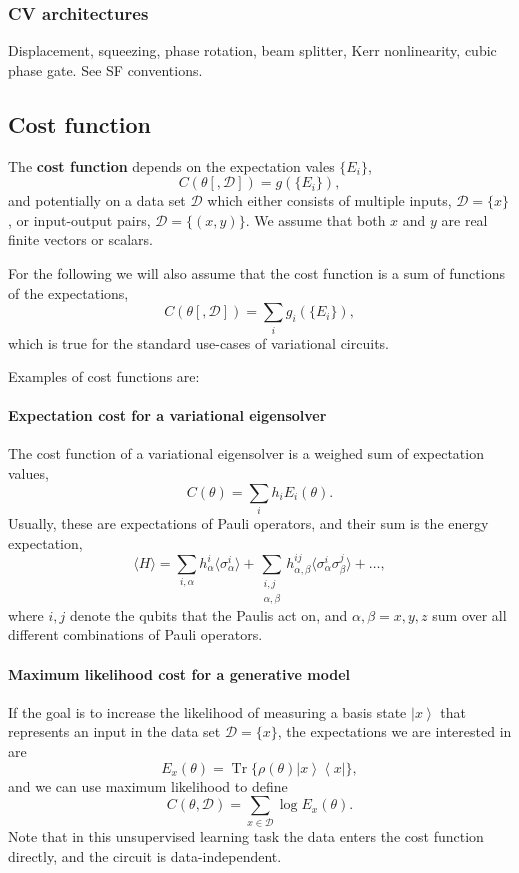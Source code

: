 \documentclass[amsmath,amssymb,aps,pra,10pt,twocolumn,groupedaddress,nofootinbib]{revtex4-1}
\DeclareMathOperator{\tr}{Tr}
\newcommand{\be}{\begin{equation}}
\newcommand{\ee}{\end{equation}}
\newcommand{\ket}[1]{\ensuremath{\left| #1 \right \rangle}}
\newcommand{\bra}[1]{\ensuremath{\left \langle #1 \right |}}
\newcommand{\ketbra}[2]{\ket{#1}\bra{#2}}
\begin{document}
\subsubsection{CV architectures}

Displacement, squeezing, phase rotation, beam splitter, Kerr nonlinearity, cubic phase gate. See SF conventions.

\subsection{Cost function}

The \textbf{cost function} depends on the expectation vales $\{E_i\}$,
\[C(\theta[, \mathcal{D}]) = g(\{E_i\}),\]
and potentially on a data set $\mathcal{D}$ which either consists of
multiple inputs, $\mathcal{D} = \{x\}$, or input-output pairs,
$\mathcal{D} = \{(x ,y)\}$. We assume that both $x$ and $y$ are real
finite vectors or scalars.

For the following we will also assume that the cost function is a sum of functions of the expectations,
\be
C(\theta[, \mathcal{D}]) = \sum_i g_i(\{E_i\}),
\label{eq:cost}
\ee
which is true for the standard use-cases of variational circuits.

\color{black!80!white}
Examples of cost functions are:

\paragraph{Expectation cost for a variational eigensolver}

The cost function of a variational eigensolver is a weighed sum of expectation values,
\[ C(\theta) = \sum_i h_i E_i(\theta). \]
Usually, these are expectations of Pauli operators, and their sum is the energy expectation,
\[\langle H \rangle = \sum\limits_{i, \alpha} h^i_{\alpha} \langle\sigma^i_{\alpha}\rangle + \sum\limits_{\substack{i,j\\ \alpha, \beta}} h^{ij}_{\alpha, \beta} \langle \sigma^i_{\alpha}\sigma^j_{\beta}\rangle + \hdots,\]
where $i,j$ denote the qubits that the Paulis act on, and
$\alpha, \beta = x,y,z$ sum over all different combinations of Pauli operators.

\paragraph{Maximum likelihood cost for a generative model}
If the goal is to increase the likelihood of measuring a basis state
$\ket{x}$ that represents an input in the data set
$\mathcal{D} = \{x\}$, the expectations we are interested in are
\be
E_x(\theta) =  \tr\{\rho(\theta) \ketbra{x}{x}  \},
\ee
and we can use maximum likelihood to define
\[C(\theta, \mathcal{D}) = \sum_{x \in \mathcal{D}}\log E_x(\theta) .\]
Note that in this unsupervised learning task the data enters the cost function directly, and the circuit is data-independent.
\end{document}
